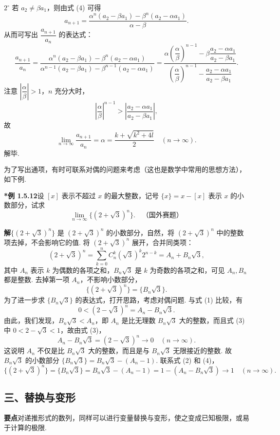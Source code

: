 \documentclass[UTF8,12pt,a4paper,fontset=fandol]{ctexart}
\begin{document}
$2^\circ$ 若 $a_2\ne \beta a_1$，则由式 (4) 可得
\[
  a_{n+1}
  =\frac{\alpha^n(a_2-\beta a_1)-\beta^n(a_2-\alpha a_1)}{\alpha-\beta}.
\]
从而可写出 $\dfrac{a_{n+1}}{a_n}$ 的表达式：
\[
  \frac{a_{n+1}}{a_n}
  =\frac{\alpha^n(a_2-\beta a_1)-\beta^n(a_2-\alpha a_1)}
    {\alpha^{n-1}(a_2-\beta a_1)-\beta^{n-1}(a_2-\alpha a_1)}
  =\frac{\alpha\left(\dfrac{\alpha}{\beta}\right)^{n-1}
      -\beta\dfrac{a_2-\alpha a_1}{a_2-\beta a_1}}
    {\left(\dfrac{\alpha}{\beta}\right)^{n-1}
      -\dfrac{a_2-\alpha a_1}{a_2-\beta a_1}}.
\]
注意 $\left|\dfrac{\alpha}{\beta}\right|>1$，$n$ 充分大时，
\[
  \left|\frac{\alpha}{\beta}\right|^{n-1}
  >\left|\frac{a_2-\alpha a_1}{a_2-\beta a_1}\right|,
\]
故
\[
  \lim_{n\to\infty}\frac{a_{n+1}}{a_n}
  =\alpha=\frac{k+\sqrt{k^2+4l}}{2}\quad (n\to\infty).
\]
解毕.

为了写出通项，有时可联系对偶的问题来考虑（这也是数学中常用的思想方法），如下例.

\noindent\textbf{*例 1.5.12}\quad 设 $[x]$ 表示不超过 $x$ 的最大整数，记号 $\{x\}=x-[x]$ 表示 $x$ 的小数部分，试求
\[
  \lim_{n\to\infty}\{(2+\sqrt3)^n\}. \quad \text{（国外赛题）}
\]

\noindent\textbf{解}\quad $\{(2+\sqrt3)^n\}$ 是 $(2+\sqrt3)^n$ 的小数部分，自然，将 $(2+\sqrt3)^n$ 中的整数项去掉，不会影响它的值. 将 $(2+\sqrt3)^n$ 展开，合并同类项：
\[
  (2+\sqrt3)^n=\sum_{k=0}^n C_n^k(\sqrt3)^k2^{n-k}=A_n+B_n\sqrt3,
\tag{1}
\]
其中 $A_n$ 表示 $k$ 为偶数的各项之和，$B_n\sqrt3$ 是 $k$ 为奇数的各项之和，可见 $A_n,B_n$ 都是整数. 去掉第一项 $A_n$，不影响小数部分，
\[
  \{(2+\sqrt3)^n\}=\{B_n\sqrt3\}.
\tag{2}
\]
为了进一步求 $\{B_n\sqrt3\}$ 的表达式，打开思路，考虑对偶问题. 与式 (1) 比较，有
\[
  0<(2-\sqrt3)^n=A_n-B_n\sqrt3.
\tag{3}
\]
由此，我们发现，$B_n\sqrt3<A_n$，即 $A_n$ 是比无理数 $B_n\sqrt3$ 大的整数，而且式 (3) 中 $0<2-\sqrt3<1$，故由式 (3)，
\[
  A_n-B_n\sqrt3=(2-\sqrt3)^n\to 0\quad (n\to\infty).
\tag{4}
\]
这说明 $A_n$ 不仅是比 $B_n\sqrt3$ 大的整数，而且是与 $B_n\sqrt3$ 无限接近的整数. 故 $B_n\sqrt3$ 的小数部分 $\{B_n\sqrt3\}=B_n\sqrt3-(A_n-1)$. 联系式 (2) 和 (4)，
\[
  \{(2+\sqrt3)^n\}=\{B_n\sqrt3\}
  =B_n\sqrt3-(A_n-1)
  =1-(A_n-B_n\sqrt3)\to 1\quad (n\to\infty).
\]

\subsection*{三、替换与变形}

\noindent\textbf{要点}\quad 对递推形式的数列，同样可以进行变量替换与变形，使之变成已知极限，或易于计算的极限.
\end{document}

